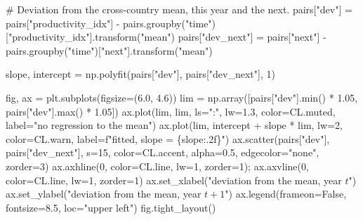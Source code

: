 \documentclass[
  letterpaper,
  10pt,
  twoside,
  openright,
  numbers=noenddot,
  chapterprefix=true]{scrbook}
\newenvironment{Shaded}{}{}
\newcommand{\BuiltInTok}[1]{\textcolor[rgb]{0.84,0.23,0.29}{#1}}
\newcommand{\CommentTok}[1]{\textcolor[rgb]{0.42,0.45,0.49}{#1}}
\newcommand{\DecValTok}[1]{\textcolor[rgb]{0.00,0.36,0.77}{#1}}
\newcommand{\FloatTok}[1]{\textcolor[rgb]{0.00,0.36,0.77}{#1}}
\newcommand{\NormalTok}[1]{\textcolor[rgb]{0.14,0.16,0.18}{#1}}
\newcommand{\OperatorTok}[1]{\textcolor[rgb]{0.14,0.16,0.18}{#1}}
\newcommand{\SpecialCharTok}[1]{\textcolor[rgb]{0.00,0.36,0.77}{#1}}
\newcommand{\SpecialStringTok}[1]{\textcolor[rgb]{0.01,0.18,0.38}{#1}}
\newcommand{\StringTok}[1]{\textcolor[rgb]{0.01,0.18,0.38}{#1}}
\newcommand{\VariableTok}[1]{\textcolor[rgb]{0.89,0.38,0.04}{#1}}
\newenvironment{qmibarchive}
  {\par\medskip\noindent{\color{econgold}\rule{\linewidth}{1.4pt}}%
   \par\nobreak\vspace{4pt}\noindent\ignorespaces}
  {\par\vspace{2pt}\noindent{\color{econrule}\rule{\linewidth}{0.4pt}}\par\medskip}
\begin{document}
\begin{qmibarchive}
\begin{Shaded}
\begin{Highlighting}[]
\CommentTok{\# Deviation from the cross{-}country mean, this year and the next.}
\NormalTok{pairs[}\StringTok{"dev"}\NormalTok{] }\OperatorTok{=}\NormalTok{ pairs[}\StringTok{"productivity\_idx"}\NormalTok{] }\OperatorTok{{-}}\NormalTok{ pairs.groupby(}\StringTok{"time"}\NormalTok{)[}\StringTok{"productivity\_idx"}\NormalTok{].transform(}\StringTok{"mean"}\NormalTok{)}
\NormalTok{pairs[}\StringTok{"dev\_next"}\NormalTok{] }\OperatorTok{=}\NormalTok{ pairs[}\StringTok{"next"}\NormalTok{] }\OperatorTok{{-}}\NormalTok{ pairs.groupby(}\StringTok{"time"}\NormalTok{)[}\StringTok{"next"}\NormalTok{].transform(}\StringTok{"mean"}\NormalTok{)}

\NormalTok{slope, intercept }\OperatorTok{=}\NormalTok{ np.polyfit(pairs[}\StringTok{"dev"}\NormalTok{], pairs[}\StringTok{"dev\_next"}\NormalTok{], }\DecValTok{1}\NormalTok{)}

\NormalTok{fig, ax }\OperatorTok{=}\NormalTok{ plt.subplots(figsize}\OperatorTok{=}\NormalTok{(}\FloatTok{6.0}\NormalTok{, }\FloatTok{4.6}\NormalTok{))}
\NormalTok{lim }\OperatorTok{=}\NormalTok{ np.array([pairs[}\StringTok{"dev"}\NormalTok{].}\BuiltInTok{min}\NormalTok{() }\OperatorTok{*} \FloatTok{1.05}\NormalTok{, pairs[}\StringTok{"dev"}\NormalTok{].}\BuiltInTok{max}\NormalTok{() }\OperatorTok{*} \FloatTok{1.05}\NormalTok{])}
\NormalTok{ax.plot(lim, lim, ls}\OperatorTok{=}\StringTok{":"}\NormalTok{, lw}\OperatorTok{=}\FloatTok{1.3}\NormalTok{, color}\OperatorTok{=}\NormalTok{CL.muted, label}\OperatorTok{=}\StringTok{"no regression to the mean"}\NormalTok{)}
\NormalTok{ax.plot(lim, intercept }\OperatorTok{+}\NormalTok{ slope }\OperatorTok{*}\NormalTok{ lim, lw}\OperatorTok{=}\DecValTok{2}\NormalTok{, color}\OperatorTok{=}\NormalTok{CL.warn,}
\NormalTok{        label}\OperatorTok{=}\SpecialStringTok{f"fitted, slope = }\SpecialCharTok{\{}\NormalTok{slope}\SpecialCharTok{:.2f\}}\SpecialStringTok{"}\NormalTok{)}
\NormalTok{ax.scatter(pairs[}\StringTok{"dev"}\NormalTok{], pairs[}\StringTok{"dev\_next"}\NormalTok{], s}\OperatorTok{=}\DecValTok{15}\NormalTok{, color}\OperatorTok{=}\NormalTok{CL.accent,}
\NormalTok{           alpha}\OperatorTok{=}\FloatTok{0.5}\NormalTok{, edgecolor}\OperatorTok{=}\StringTok{"none"}\NormalTok{, zorder}\OperatorTok{=}\DecValTok{3}\NormalTok{)}
\NormalTok{ax.axhline(}\DecValTok{0}\NormalTok{, color}\OperatorTok{=}\NormalTok{CL.line, lw}\OperatorTok{=}\DecValTok{1}\NormalTok{, zorder}\OperatorTok{=}\DecValTok{1}\NormalTok{)}\OperatorTok{;}\NormalTok{ ax.axvline(}\DecValTok{0}\NormalTok{, color}\OperatorTok{=}\NormalTok{CL.line, lw}\OperatorTok{=}\DecValTok{1}\NormalTok{, zorder}\OperatorTok{=}\DecValTok{1}\NormalTok{)}
\NormalTok{ax.set\_xlabel(}\StringTok{"deviation from the mean, year $t$"}\NormalTok{)}
\NormalTok{ax.set\_ylabel(}\StringTok{"deviation from the mean, year $t+1$"}\NormalTok{)}
\NormalTok{ax.legend(frameon}\OperatorTok{=}\VariableTok{False}\NormalTok{, fontsize}\OperatorTok{=}\FloatTok{8.5}\NormalTok{, loc}\OperatorTok{=}\StringTok{"upper left"}\NormalTok{)}
\NormalTok{fig.tight\_layout()}
\end{Highlighting}
\end{Shaded}


\end{qmibarchive}
\end{document}
